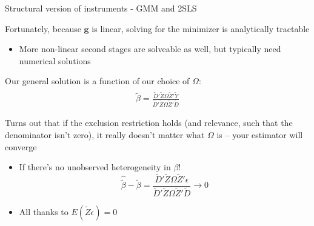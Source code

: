 \documentclass[notes,11pt, aspectratio=169]{beamer}
\newenvironment{wideitemize}{\itemize\addtolength{\itemsep}{10pt}}{\enditemize}
\begin{document}
\begin{frame}{Structural version of instruments - GMM and 2SLS}
  \begin{wideitemize}
  \item Fortunately, because $\mathbf{g}$ is linear, solving for the minimizer is analytically tractable
    \begin{itemize}
    \item More non-linear second stages are solveable as well, but typically need numerical solutions
    \end{itemize}
  \item Our general solution is a function of our choice of $\Omega$:
    \begin{align*}
      \hat{\widetilde{\beta}} = \frac{\widetilde{D}'\widetilde{Z} \Omega \widetilde{Z}'\widetilde{Y}}{\widetilde{D}'\widetilde{Z} \Omega \widetilde{Z}'\widetilde{D}}
    \end{align*}
  \item Turns out that if the exclusion restriction holds (and
    relevance, such that the denominator isn't zero), it really
    doesn't matter what $\Omega$ is -- your estimator will converge
    \begin{itemize}
    \item If there's no unobserved heterogeneity in $\beta$!
    \begin{equation*}
      \hat{\widetilde{\beta}} -\widetilde{\beta} = \frac{\widetilde{D}'\widetilde{Z} \Omega \widetilde{Z}'\epsilon}{\widetilde{D}'\widetilde{Z} \Omega \widetilde{Z}'\widetilde{D}} \rightarrow 0
    \end{equation*}
    \item All thanks to $E(\widetilde{Z}\epsilon) = 0$
    \end{itemize}
  \end{wideitemize}
\end{frame}
\end{document}
